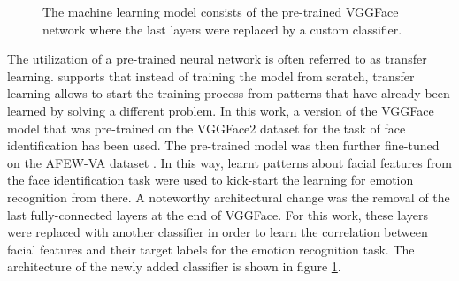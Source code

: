 \begin{figure}[H]
  \begin{center}
  \caption{The machine learning model consists of the pre-trained VGGFace network where the last layers were replaced by a custom classifier.}
  \label{fig:MachineLearningModel}
  \end{center}
\end{figure}

The utilization of a pre-trained neural network is often referred to as transfer learning. \citet{Pedro:2018:TransferLearning} supports that instead of training the model from scratch, transfer learning allows to start the training process from patterns that have already been learned by solving a different problem.
\newline\newline
In this work, a version of the VGGFace model that was pre-trained on the VGGFace2 dataset \citep{Cao:2018:VGGFace2} for the task of face identification has been used. The pre-trained model was then further fine-tuned on the AFEW-VA dataset \citep{Kossaifi:2017:AFEW-VADatabase}. In this way, learnt patterns about facial features from the face identification task were used to kick-start the learning for emotion recognition from there. 
\newline\newline
A noteworthy architectural change was the removal of the last fully-connected layers at the end of VGGFace. For this work, these layers were replaced with another classifier in order to learn the correlation between facial features and their target labels for the emotion recognition task. The architecture of the newly added classifier is shown in figure \ref{fig:MachineLearningModel}.